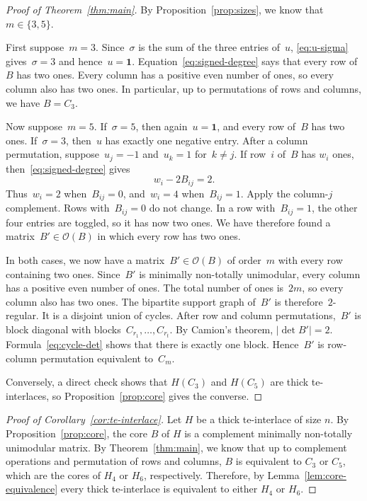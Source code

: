 \documentclass{amsart}
\numberwithin{equation}{section}
\newcommand{\one}{\mathbf 1}
\newcommand{\cO}{\mathcal O}
\begin{document}
\begin{proof}[Proof of Theorem~\ref{thm:main}]
    By Proposition~\ref{prop:sizes}, we know that $m\in\{3,5\}$.

    First suppose~$m=3$.
    Since~$\sigma$ is the sum of the three entries of~$u$, \eqref{eq:u-sigma} gives~$\sigma=3$ and hence~$u=\one$.
    Equation~\eqref{eq:signed-degree} says that every row of~$B$ has two ones.
    Every column has a positive even number of ones, so every column also has two ones.
    In particular, up to permutations of rows and columns, we have $B=C_3$.
    
    Now suppose~$m=5$.
    If~$\sigma=5$, then again~$u=\one$, and every row of~$B$ has two ones.
    If~$\sigma=3$, then~$u$ has exactly one negative entry.
    After a column permutation, suppose~$u_j=-1$ and~$u_k=1$ for~$k\neq j$.
    If row~$i$ of~$B$ has $w_i$ ones, then~\eqref{eq:signed-degree} gives
    $$
        w_i-2B_{ij}=2.
    $$
    Thus~$w_i=2$ when~$B_{ij}=0$, and~$w_i=4$ when~$B_{ij}=1$.
    Apply the column-$j$ complement.
    Rows with~$B_{ij}=0$ do not change.
    In a row with~$B_{ij}=1$, the other four entries are toggled, so it has now two ones.
    We have therefore found a matrix~$B'\in\cO(B)$ in which every row has two ones.
    
    In both cases, we now have a matrix~$B'\in\cO(B)$ of order~$m$ with every row containing two ones.
    Since~$B'$ is minimally non-totally unimodular, every column has a positive even number of ones.
    The total number of ones is~$2m$, so every column also has two ones.
    The bipartite support graph of~$B'$ is therefore~$2$-regular.
    It is a disjoint union of cycles.
    After row and column permutations,~$B'$ is block diagonal with blocks~$C_{r_1},\ldots,C_{r_t}$.
    By Camion's theorem, $|\det B'|=2$.
    Formula~\eqref{eq:cycle-det} shows that there is exactly one block.
    Hence~$B'$ is row-column permutation equivalent to~$C_m$.
    
    Conversely, a direct check shows that $H(C_3)$ and $H(C_5)$ are thick te-interlaces, so Proposition~\ref{prop:core} gives the converse.
\end{proof}

\begin{proof}[Proof of Corollary~\ref{cor:te-interlace}]
    Let $H$ be a thick te-interlace of size $n$.
    By Proposition~\ref{prop:core}, the core $B$ of $H$ is a complement minimally non-totally unimodular matrix.
    By Theorem~\ref{thm:main}, we know that up to complement operations and permutation of rows and columns, $B$ is equivalent to $C_3$ or $C_5$, which are the cores of $H_4$ or $H_6$, respectively.
    Therefore, by Lemma~\ref{lem:core-equivalence} every thick te-interlace is equivalent to either $H_4$ or $H_6$.
\end{proof}
\end{document}
